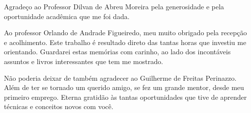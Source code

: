 Agradeço ao Professor Dilvan de Abreu Moreira pela 
generosidade e pela oportunidade acadêmica que me foi dada. 

Ao professor Orlando de Andrade Figueiredo, meu muito obrigado pela recepção e acolhimento. 
Este trabalho é resultado direto das tantas horas que investiu me orientando. Guardarei estas memórias com carinho, ao lado dos incontáveis
assuntos e livros interessantes que tem me mostrado. 

Não poderia deixar de também agradecer ao Guilherme de Freitas Perinazzo. Além de ter se tornado um querido amigo, 
se fez um grande mentor, desde meu primeiro emprego. Eterna gratidão às tantas 
oportunidades que tive de aprender técnicas e conceitos novos com você.

